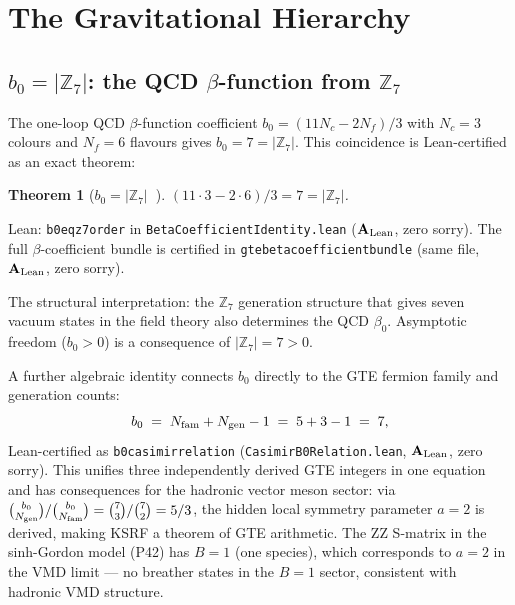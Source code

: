 \documentclass[11pt]{article}
\newtheorem{theorem}{Theorem}[section]
\theoremstyle{remark}
\newcommand{\ZS}{\mathbb{Z}_7}
\newcommand{\lean}[1]{%
  \penalty-100
  \begingroup\def\_{\textunderscore\allowbreak}\texttt{#1}\endgroup}
\newcommand{\Ngen}{N_{\rm gen}}
\newcommand{\Nfam}{N_{\rm fam}}
\newcommand{\CatAL}{\ensuremath{\textbf{A}_{\rm Lean}}}
\begin{document}
\FloatBarrier
\section{The Gravitational Hierarchy}
\label{sec:hierarchy}

\subsection{\texorpdfstring{$b_0 = |\ZS|$: the QCD $\beta$-function from $\ZS$}{b0 = |Z7|: the QCD beta-function from Z7}}

The one-loop QCD $\beta$-function coefficient $b_0 = (11 N_c - 2 N_f)/3$ with
$N_c = 3$ colours and $N_f = 6$ flavours gives $b_0 = 7 = |\ZS|$.
This coincidence is Lean-certified as an exact theorem:

\begin{theorem}[\textbf{$b_0 = |\ZS|$~\cite{SpivackGTEQCDStructure}}]
\label{thm:b0}
$(11\cdot 3 - 2\cdot 6)/3 = 7 = |\ZS|$.
\end{theorem}

\noindent
Lean: \lean{b0\_eq\_z7\_order} in \lean{BetaCoefficientIdentity.lean} ($\CatAL$,
zero sorry).  The full $\beta$-coefficient bundle is certified in
\lean{gte\_beta\_coefficient\_bundle} (same file, $\CatAL$, zero sorry).

The structural interpretation: the $\ZS$ generation structure that gives seven
vacuum states in the field theory also determines the QCD $\beta_0$.  Asymptotic
freedom ($b_0 > 0$) is a consequence of $|\ZS| = 7 > 0$.

A further algebraic identity connects $b_0$ directly to the GTE fermion family and
generation counts:
\begin{equation}
  b_0 \;=\; N_{\rm fam} + N_{\rm gen} - 1 \;=\; 5 + 3 - 1 \;=\; 7,
  \label{eq:casimir_rel}
\end{equation}
Lean-certified as \lean{b0\_casimir\_relation} (\texttt{CasimirB0Relation.lean},
$\CatAL$, zero sorry).  This unifies three independently derived GTE integers in one
equation and has consequences for the hadronic vector meson sector: via
$\binom{b_0}{\Ngen}/\binom{b_0}{\Nfam} = \binom{7}{3}/\binom{7}{2} = 5/3$, the
hidden local symmetry parameter $a = 2$ is derived, making KSRF a theorem of GTE
arithmetic.  The ZZ S-matrix in the sinh-Gordon model (P42) has $B = 1$ (one
species), which corresponds to $a = 2$ in the VMD limit --- no breather states in
the $B{=}1$ sector, consistent with hadronic VMD structure.
\end{document}
